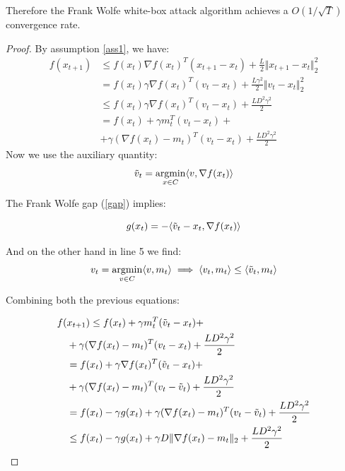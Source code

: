 \documentclass[10pt,twocolumn,letterpaper, english]{article}
\newcommand{\argmin}{\mathop{\mathrm{argmin}}}
\theoremstyle{definition}
\theoremstyle{plain}
\theoremstyle{plain}
\theoremstyle{plain}
\theoremstyle{plain}
\theoremstyle{remark}
\theoremstyle{remark}
\theoremstyle{definition}
\theoremstyle{definition}
\theoremstyle{definition}
\theoremstyle{definition}
\begin{document}
Therefore the Frank Wolfe white-box attack algorithm achieves a $O(1/\sqrt{T})$ convergence rate.

\begin{proof}

By assumption \ref{ass1}, we have:
\begin{align*}
    f(x_{t+1}) & \le f(x_t) \nabla f(x_t)^T ( x_{t+1} - x_t) + \frac{L}{2} \Vert x_{t+1} - x_t \Vert_{2}^2 \\
    &= f(x_t) \gamma \nabla f(x_t)^T ( v_t - x_t) + \frac{L \gamma^2}{2} \Vert v_t - x_t \Vert_{2}^2\\
    & \le f(x_t) \gamma \nabla f(x_t)^T ( v_t - x_t) + \frac{L D^2 \gamma^2}{2}\\
    &= f(x_t) + \gamma m_{t}^T ( v_t - x_t) +\\
    &+ \gamma(\nabla f(x_t) - m_t)^T (v_t - x_t) + \frac{L D^2 \gamma^2}{2} 
\end{align*}
Now we use the auxiliary quantity:
\begin{equation*}
    \Tilde{v}_t = \argmin_{x \in C} \langle v, \nabla f(x_t) \rangle 
\end{equation*}

The Frank Wolfe gap (\ref{gap}) implies:

\begin{equation*}
    g(x_t)= - \langle \Tilde{v}_t -x_t, \nabla f(x_t) \rangle 
\end{equation*}

And on the other hand in line 5 we find:
\begin{equation*}
    v_t= \argmin_{v \in C}\langle v,m_t \rangle \implies \langle v_t,m_t \rangle  \le  \langle \Tilde{v}_t, m_t \rangle 
\end{equation*}

Combining both the previous equations:

\begin{align*}
    f(& x_{t+1}) \le f(x_t) + \gamma m_{t}^T ( \Tilde{v}_t - x_t) +\\
    & + \gamma (\nabla f(x_t) - m_t)^T (v_t - x_t) + \frac{L D^2 \gamma^2}{2} \\
    & = f(x_t) + \gamma \nabla f(x_t)^T (\Tilde{v}_t - x_t) + \\
    &+ \gamma (\nabla f(x_t) - m_t)^T (v_t - \Tilde{v}_t) + \frac{L D^2 \gamma^2}{2}\\
    &= f(x_t) - \gamma g(x_t) + \gamma (\nabla f(x_t) - m_t)^T (v_t - \Tilde{v}_t) + \frac{L D^2 \gamma^2}{2} \\
    & \le  f(x_t) - \gamma g(x_t) + \gamma D \Vert \nabla f(x_t) - m_t \Vert_2 + \frac{L D^2 \gamma^2}{2}
\end{align*}


\end{proof}
\end{document}
